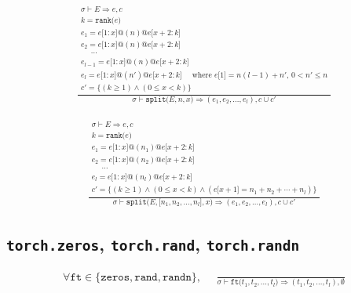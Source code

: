\documentclass{article}
\makeatletter
\newcommand{\Rar}{\Rightarrow}
\newcommand{\mtt}[1]{\mathtt{#1}}
\newcommand{\bigspace}{\,\,\,\,\,\,\,\,}
\newcommand{\op}[2]{\mtt{#1(}#2\mtt{)}}
\newcommand{\conc}{\mtt{@}}
\newcommand{\ind}[1]{\mtt{[}#1\mtt{]}}
\newcommand{\indr}[2]{\mtt{[}#1\mtt{:}#2\mtt{]}}
\makeatother
\begin{document}
\begin{align*}
  \frac
  {
    \begin{array}{l}
      \sigma \vdash E \Rar e, c \\
      k = \op{rank}{e} \\
      e_1 = e\indr{1}{x} \conc (n) \conc e\indr{x+2}{k} \\
      e_2 = e\indr{1}{x} \conc (n) \conc e\indr{x+2}{k} \\
      \bigspace \cdots \\
      e_{l-1} = e\indr{1}{x} \conc (n) \conc e\indr{x+2}{k} \\
      e_l = e\indr{1}{x} \conc (n') \conc e\indr{x+2}{k} \bigspace
        \text{where $e \ind{1} = n(l-1) + n'$, $0 < n' \leq n$} \\
      c' = \{ (k \geq 1) \land (0 \leq x < k) \}
    \end{array}
  }
  {
    \sigma \vdash \op{split}{E, n, x} \Rar (e_1, e_2, \dots, e_l), c \cup c'
  }
  \tag*{$l$-원소 tuple 형태로 반환}
\end{align*}

\begin{align*}
  \frac
  {
    \begin{array}{l}
      \sigma \vdash E \Rar e, c \\
      k = \op{rank}{e} \\
      e_1 = e\indr{1}{x} \conc (n_1) \conc e\indr{x+2}{k} \\
      e_2 = e\indr{1}{x} \conc (n_2) \conc e\indr{x+2}{k} \\
      \bigspace \cdots \\
      e_l = e\indr{1}{x} \conc (n_l) \conc e\indr{x+2}{k} \\
      c' = \{ (k \geq 1) \land (0 \leq x < k) \land
        (e \ind{x+1} = n_1 + n_2 + \cdots + n_l) \}
    \end{array}
  }
  {
    \sigma \vdash \op{split}{E, \ind{n_1, n_2, \dots, n_l}, x}
      \Rar (e_1, e_2, \dots, e_l), c \cup c'
  }
  \tag*{$l$-원소 tuple 형태로 반환}
\end{align*}%

\subsection*{\texttt{torch.zeros}, \texttt{torch.rand}, \texttt{torch.randn}}%
\begin{align*}
  \forall \mtt{ft} \in \{\mtt{zeros}, \mtt{rand}, \mtt{randn}\},
  \bigspace
  \frac
  {
  }
  {
    \sigma \vdash \op{ft}{t_1, t_2, \dots, t_l} \Rar (t_1, t_2, \dots, t_l),
      \emptyset
  }
\end{align*}%
\end{document}
